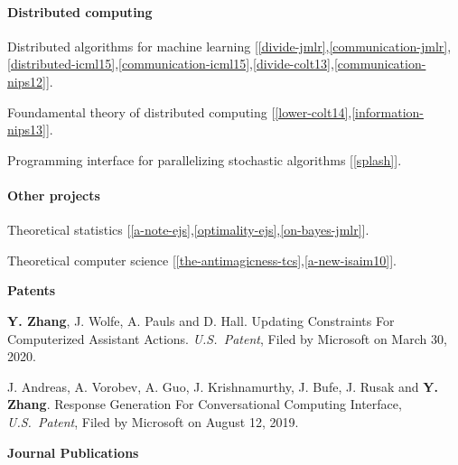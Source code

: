 \documentclass{res}
\newenvironment{my_item}{
\begin{itemize}
  \setlength{\itemsep}{0pt}
  \setlength{\parskip}{0pt}
  \setlength{\parsep}{0pt}}
{\end{itemize}
}
\begin{document}
\begin{resume}
\vspace{-5pt}
\paragraph{Distributed computing}
\begin{my_item}
\item Distributed algorithms for machine learning [\ref{divide-jmlr},\ref{communication-jmlr},\ref{distributed-icml15},\ref{communication-icml15},\ref{divide-colt13},\ref{communication-nips12}].
\item Foundamental theory of distributed computing [\ref{lower-colt14},\ref{information-nips13}].
\item Programming interface for parallelizing stochastic algorithms [\ref{splash}].
\end{my_item}

\vspace{-5pt}
\paragraph{Other projects}
\begin{my_item}
\item Theoretical statistics [\ref{a-note-ejs},\ref{optimality-ejs},\ref{on-bayes-jmlr}].
\item Theoretical computer science [\ref{the-antimagicness-tcs},\ref{a-new-isaim10}].
\end{my_item}

{\bf\Large Patents}
\vspace{5pt}

\begin{enumerate}[label={[P\arabic*]}, ref={P\arabic*}]
\item \label{updating-patent} \textbf{Y. Zhang}, J. Wolfe, A. Pauls and D. Hall. Updating Constraints For Computerized Assistant Actions. \emph{U.S.~Patent}, Filed by Microsoft on March 30, 2020.
\item \label{reponse-patent} J. Andreas, A. Vorobev, A. Guo, J. Krishnamurthy, J. Bufe, J. Rusak and \textbf{Y. Zhang}. Response Generation For Conversational Computing Interface, \emph{U.S.~Patent}, Filed by Microsoft on August 12, 2019.
\end{enumerate}

{\bf\Large Journal Publications}
\vspace{5pt}

\begin{enumerate}[label={[J\arabic*]}, ref={J\arabic*}]


\end{enumerate}
\end{resume}
\end{document}
